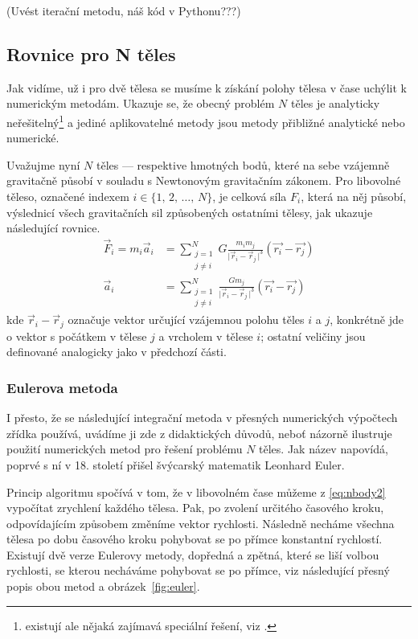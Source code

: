 \documentclass[A4paper, 12pt, oneside]{book}
\newcommand{\abs}[1]{\lvert #1 \,\rvert}
\begin{document}
(Uvést iterační metodu, náš kód v Pythonu???)

\subsection{Rovnice pro N těles}
Jak vidíme, už i pro dvě tělesa se musíme k získání polohy tělesa v čase uchýlit k numerickým metodám. Ukazuje se, že obecný problém $N$ těles je analyticky neřešitelný\footnote{existují ale nějaká zajímavá speciální řešení, viz \cite{cohan12}.} a jediné aplikovatelné metody jsou metody přibližné analytické nebo numerické.

Uvažujme nyní $N$ těles --- respektive hmotných bodů, které na sebe vzájemně gravitačně působí v souladu s Newtonovým gravitačním zákonem. Pro libovolné těleso, označené indexem $i\in\{1,\,2,\,\dots,\,N\}$, je celková síla $F_i$, která na něj působí, výslednicí všech gravitačních sil způsobených ostatními tělesy, jak ukazuje následující rovnice.
\begin{align} 
	\vec{F}_i = m_i\vec{a}_i &= \sum_{\substack{j=1 \\ j\neq i}}^N G\frac{m_im_j}{\abs{\vec{r}_i-\vec{r}_j}^3}(\vec{r_i}-\vec{r_j}) \label{eq:nbody1}\\
		\vec{a}_i &= \sum_{\substack{j=1 \\ j\neq i}}^N \frac{Gm_j}{\abs{\vec{r}_i-\vec{r}_j}^3}(\vec{r_i}-\vec{r_j}) \label{eq:nbody2}
\end{align}
kde $\vec{r}_i-\vec{r}_j$ označuje vektor určující vzájemnou polohu těles $i$ a $j$, konkrétně jde o vektor s počátkem v tělese $j$ a vrcholem v tělese $i$; ostatní veličiny jsou definované analogicky jako v předchozí části.
\subsubsection{Eulerova metoda}
I přesto, že se následující integrační metoda v přesných numerických výpočtech zřídka používá, uvádíme ji zde z didaktických důvodů, neboť názorně ilustruje použití numerických metod pro řešení problému $N$ těles. Jak název napovídá, poprvé s ní v 18. století přišel švýcarský matematik Leonhard Euler.

Princip algoritmu spočívá v tom, že v libovolném čase můžeme z \eqref{eq:nbody2} vypočítat zrychlení každého tělesa. Pak, po zvolení určitého časového kroku, odpovídajícím způsobem změníme vektor rychlosti. Následně necháme všechna tělesa po dobu časového kroku pohybovat se po přímce konstantní rychlostí. Existují dvě verze Eulerovy metody, dopředná a zpětná, které se liší volbou rychlosti, se kterou necháváme pohybovat se po přímce, viz následující přesný popis obou metod a obrázek~\ref{fig:euler}.
\end{document}

